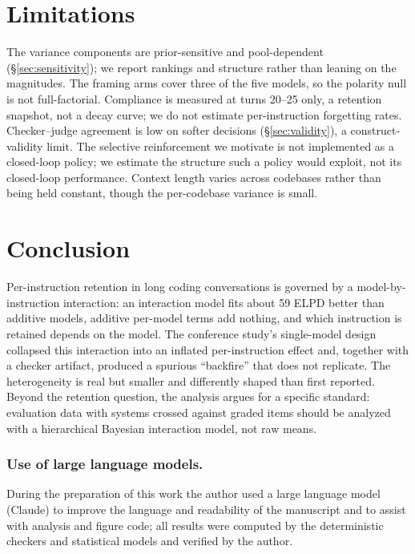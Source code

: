\documentclass{llncs}
\begin{document}
\section{Limitations}
\label{sec:limitations}
The variance components are prior-sensitive and pool-dependent
(\S\ref{sec:sensitivity}); we report rankings and structure rather than
leaning on the magnitudes. The framing arms cover three of the five models,
so the polarity null is not full-factorial. Compliance is measured at turns
20--25 only, a retention snapshot, not a decay curve; we do not estimate
per-instruction forgetting rates. Checker--judge agreement is low on softer
decisions (\S\ref{sec:validity}), a construct-validity limit. The selective
reinforcement we motivate is not implemented as a closed-loop policy; we
estimate the structure such a policy would exploit, not its closed-loop
performance. Context length varies across codebases rather than being held
constant, though the per-codebase variance is small.

\section{Conclusion}
Per-instruction retention in long coding conversations is governed by a
model-by-instruction interaction: an interaction model fits about 59 ELPD
better than additive models, additive per-model terms add nothing, and which
instruction is retained depends on the model. The conference study's
single-model design collapsed this interaction into an inflated
per-instruction effect and, together with a checker artifact, produced a
spurious ``backfire'' that does not replicate. The heterogeneity is real but
smaller and differently shaped than first reported. Beyond the retention
question, the analysis argues for a specific standard: evaluation data with
systems crossed against graded items should be analyzed with a hierarchical
Bayesian interaction model, not raw means.

\subsubsection*{Use of large language models.}
During the preparation of this work the author used a large language model
(Claude) to improve the language and readability of the manuscript and to
assist with analysis and figure code; all results were computed by the
deterministic checkers and statistical models and verified by the author.

\printbibliography
\end{document}

